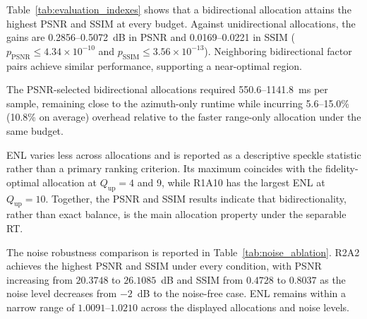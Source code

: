 \documentclass[conference]{IEEEtran}
\begin{document}
Table~\ref{tab:evaluation_indexes} shows that a bidirectional allocation attains the highest PSNR and SSIM at every budget. Against unidirectional allocations, the gains are 0.2856--0.5072~dB in PSNR and 0.0169--0.0221 in SSIM ($p_{\mathrm{PSNR}}\leq4.34\times10^{-10}$ and $p_{\mathrm{SSIM}}\leq3.56\times10^{-13}$). Neighboring bidirectional factor pairs achieve similar performance, supporting a near-optimal region.

The PSNR-selected bidirectional allocations required 550.6--1141.8~ms per sample, remaining close to the azimuth-only runtime while incurring 5.6--15.0\% (10.8\% on average) overhead relative to the faster range-only allocation under the same budget.

ENL varies less across allocations and is reported as a descriptive speckle statistic rather than a primary ranking criterion. Its maximum coincides with the fidelity-optimal allocation at $Q_{\mathrm{up}}=4$ and 9, while R1A10 has the largest ENL at $Q_{\mathrm{up}}=10$. Together, the PSNR and SSIM results indicate that bidirectionality, rather than exact balance, is the main allocation property under the separable RT.

The noise robustness comparison is reported in Table~\ref{tab:noise_ablation}. R2A2 achieves the highest PSNR and SSIM under every condition, with PSNR increasing from $20.3748$ to $26.1085$~dB and SSIM from $0.4728$ to $0.8037$ as the noise level decreases from $-2$~dB to the noise-free case. ENL remains within a narrow range of $1.0091$--$1.0210$ across the displayed allocations and noise levels.
\end{document}
